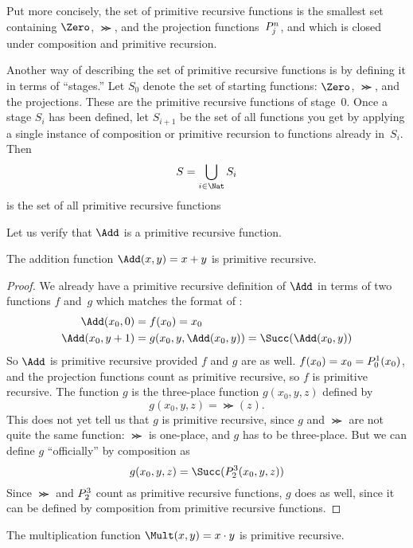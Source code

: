 \documentclass[../../../include/open-logic-section]{subfiles}
\begin{document}
\begin{explain}
Put more concisely, the set of primitive recursive functions is the
smallest set containing $\Zero$, $\Succ$, and the projection
functions~$P^{n}_{j}$, and which is closed under composition and
primitive recursion.

Another way of describing the set of primitive recursive functions is
by defining it in terms of ``stages.'' Let $S_0$ denote the set of
starting functions: $\Zero$, $\Succ$, and the projections. These are
the primitive recursive functions of stage~$0$. Once a stage $S_i$ has
been defined, let $S_{i+1}$ be the set of all functions you get by
applying a single instance of composition or primitive recursion to
functions already in~$S_i$. Then
\[
S = \bigcup_{i \in \Nat} S_i
\]
is the set of all primitive recursive functions
\end{explain}

Let us verify that $\Add$ is a primitive recursive function.

\begin{prop}
  The addition function $\Add(x,y) = x+y$ is primitive recursive.
\end{prop}

\begin{proof}
We already have a primitive recursive definition of $\Add$ in terms of
two functions $f$ and~$g$ which matches the format of
:
\begin{align*}
  \Add(x_0, 0) & = f(x_0) = x_0\\
  \Add(x_0, y+1) & = g(x_0, y, \Add(x_0, y)) =
  \Succ(\Add(x_0, y))
\end{align*}
So $\Add$ is primitive recursive provided $f$ and $g$ are as
well. $f(x_0) = x_0 = P^{1}_{0}(x_0)$, and the projection functions
count as primitive recursive, so $f$ is primitive recursive. The
function $g$ is the three-place function $g(x_0, y, z)$ defined by
\[
g(x_0, y, z) = \Succ(z).
\]
This does not yet tell us that $g$ is primitive recursive, since $g$
and $\Succ$ are not quite the same function: $\Succ$ is one-place, and
$g$ has to be three-place. But we can define $g$ ``officially'' by
composition as
\[
g(x_0, y, z) = \Succ(\Proj{3}{2}(x_0, y, z))
\]
Since $\Succ$ and $P^{3}_{2}$ count as primitive recursive
functions, $g$ does as well, since it can be defined by composition
from primitive recursive functions.
\end{proof}

\begin{prop}
  The multiplication function $\Mult(x,y) = x \cdot y$ is primitive recursive.
\end{prop}
\end{document}

